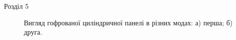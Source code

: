 \documentclass[8pt]{beamer}
\numberwithin{figure}{section}
\numberwithin{equation}{section}
\numberwithin{table}{section}
\begin{document}
\begin{frame}{Розділ 5}
\begin{figure}[h]
\begin{minipage}[h]{0.49\linewidth}
\end{minipage}
\hfill
\begin{minipage}[h]{0.49\linewidth}
\end{minipage}
\caption{Вигляд гофрованої циліндричної панелі в різних модах: а) перша; б) друга.}
\end{figure}
\end{frame}
\end{document}
